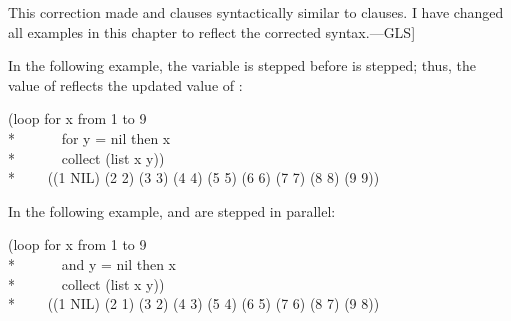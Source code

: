 \begin{new}
This correction made  and  clauses syntactically
similar to  clauses.  I have changed all examples in this
chapter to reflect the corrected syntax.---GLS]

In the following example, the variable  is stepped
before  is stepped; thus, the value of 
reflects the updated value of :
\begin{lisp}
(loop for x from 1 to 9 \\*
~~~~~~for y = nil then x  \\*
~~~~~~collect (list x y)) \\*
~~~\EV~((1 NIL) (2 2) (3 3) (4 4) (5 5) (6 6) (7 7) (8 8) (9 9))
\end{lisp}

In the following example,  and  are stepped in parallel:
\begin{lisp}
(loop for x from 1 to 9 \\*
~~~~~~and y = nil then x \\*
~~~~~~collect (list x y)) \\*
~~~\EV~((1 NIL) (2 1) (3 2) (4 3) (5 4) (6 5) (7 6) (8 7) (9 8))
\end{lisp}


\end{new}
